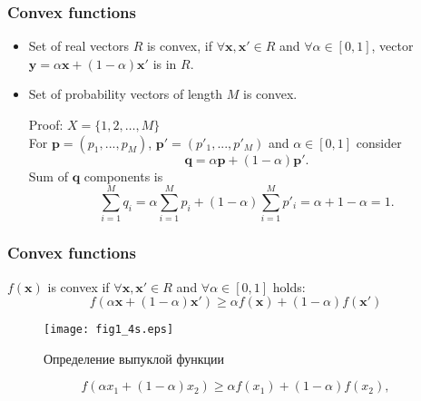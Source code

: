 \documentclass[14pt]{beamer}
\renewcommand{\vec}[1]{\ensuremath{\boldsymbol{#1}}}
\begin{document}

\begin{frame}
\frametitle{Convex functions}
\begin{itemize}

    \item Set of real vectors $R$ is convex, if $ \forall \vec x,\vec x' \in R$ and $\forall \alpha \in [0,1]$, vector $\vec y = \alpha \vec x + (1 - \alpha)\vec x'$ is in $R$.

    \item 
    \begin{theorem}
    \label{stoch}
    Set of probability vectors of length $M$ is convex.
    \end{theorem}
    \small{
    Proof:    
    $X=\{1,2,\dots,M\}$  \\
    For $\vec p = (p_1 ,...,p_M )$, $\vec p' = (p'_1 ,...,p'_M )$ and $\alpha \in [0,1]$ consider
    \[
    \vec q = \alpha \vec p + (1 - \alpha )\vec p'.
    \]
    Sum of $\vec q$ components is
    \[
    \sum\limits_{i = 1}^M {q_i } = \alpha \sum\limits_{i = 1}^M {p_i } + (1 -
    \alpha )\sum\limits_{i = 1}^M {{p}'_i } = \alpha + 1 - \alpha = 1.
    \]
    }
    
\end{itemize}
\end{frame}



\begin{frame}
\frametitle{Convex functions}
\begin{itemize}
\small{
    
    \item $f({\vec x})$ is convex if $\forall {\vec x},{\vec x}' \in R$ and $\forall \alpha \in [0,1]$ holds:
    \begin{equation}
    \label{eq1_4} f(\alpha {\vec x} + (1 - \alpha ){\vec x}') \ge \alpha
    f({\vec x}) + (1 - \alpha )f({\vec x}')
    \end{equation}
    
    \begin{figure}[ht]
    \begin{minipage}{1.0\linewidth}
    \begin{center}
    \texttt{[image: fig1\_4s.eps]}
    \caption{Определение выпуклой функции} \label{confun}
    \end{center}
    \end{minipage}
    \end{figure}
    
    \item 
    \[
    f(\alpha x_1+ (1-\alpha )x_2) \ge \alpha f(x_1)+ (1-\alpha
    )f(x_2),
    \]
}
\end{itemize}
\end{frame}
\end{document}
